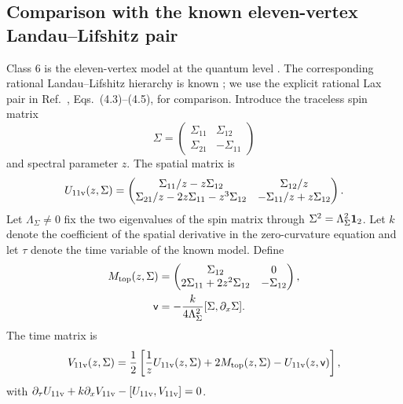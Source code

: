 \subsection{Comparison with the known eleven-vertex Landau--Lifshitz pair}
\label{sec:class6-eleven-vertex-comparison}

Class 6 is the eleven-vertex model at the quantum level
\cite{CorcoranDeLeeuw2024}.  The corresponding rational
Landau--Lifshitz hierarchy is known \cite{LevinOlshanetskyZotov2014}; we use
the explicit rational Lax pair in
Ref.~\cite{AtalikovZotov2021}, Eqs.~(4.3)--(4.5), for comparison.
Introduce the traceless spin matrix
\begin{equation}
\Sigma=
\begin{pmatrix}
\Sigma_{11}&\Sigma_{12}\\
\Sigma_{21}&-\Sigma_{11}
\end{pmatrix}
\end{equation}
and spectral parameter $z$.  The spatial matrix is
\begin{equation}
U_{\rm 11v}(z,\Sigma)=
\begin{pmatrix}
\Sigma_{11}/z-z\Sigma_{12}&\Sigma_{12}/z\\
\Sigma_{21}/z-2z\Sigma_{11}-z^3\Sigma_{12}
&-\Sigma_{11}/z+z\Sigma_{12}
\end{pmatrix}.
\label{eq:class6-known-eleven-U}
\end{equation}
Let $\Lambda_{\Sigma}\ne0$ fix the two eigenvalues of the spin matrix through
$\Sigma^2=\Lambda_{\Sigma}^2\mathbf{1}_2$.  Let $k$ denote the coefficient of the
spatial derivative in the zero-curvature equation and let $\tau$ denote the
time variable of the known model.  Define
\begin{align}
M_{\rm top}(z,\Sigma)
&=\begin{pmatrix}
\Sigma_{12}&0\\
2\Sigma_{11}+2z^2\Sigma_{12}&-\Sigma_{12}
\end{pmatrix},
\nonumber\\
\mathsf v
&=-\frac{k}{4\Lambda_{\Sigma}^2}
[\Sigma,\partial_x\Sigma].
\end{align}
The time matrix is
\begin{equation}
V_{\rm 11v}(z,\Sigma)
=\frac12\left[
\frac{1}{z}U_{\rm 11v}(z,\Sigma)
+2M_{\rm top}(z,\Sigma)
-U_{\rm 11v}(z,\mathsf v)
\right],
\label{eq:class6-known-eleven-V}
\end{equation}
with
$\partial_{\tau}U_{\rm 11v}+k\partial_xV_{\rm 11v}
-[U_{\rm 11v},V_{\rm 11v}]=0$.

